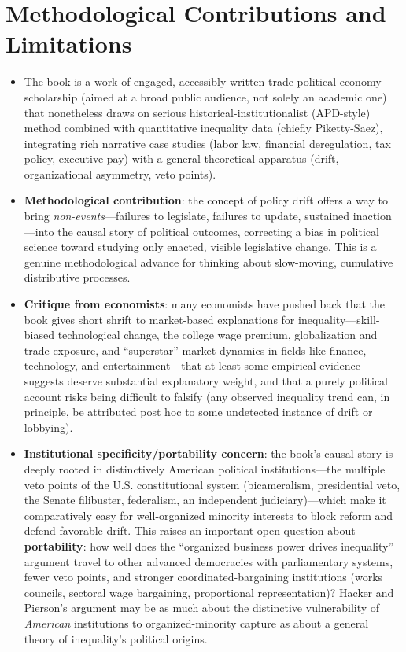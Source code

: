 \documentclass[12pt]{article}
\begin{document}
\section{Methodological Contributions and Limitations}

\begin{itemize}[leftmargin=*, itemsep=4pt]
    \item The book is a work of engaged, accessibly written trade political-economy scholarship (aimed at a broad public audience, not solely an academic one) that nonetheless draws on serious historical-institutionalist (APD-style) method combined with quantitative inequality data (chiefly Piketty-Saez), integrating rich narrative case studies (labor law, financial deregulation, tax policy, executive pay) with a general theoretical apparatus (drift, organizational asymmetry, veto points).
    \item \textbf{Methodological contribution}: the concept of policy drift offers a way to bring \emph{non-events}---failures to legislate, failures to update, sustained inaction---into the causal story of political outcomes, correcting a bias in political science toward studying only enacted, visible legislative change. This is a genuine methodological advance for thinking about slow-moving, cumulative distributive processes.
    \item \textbf{Critique from economists}: many economists have pushed back that the book gives short shrift to market-based explanations for inequality---skill-biased technological change, the college wage premium, globalization and trade exposure, and ``superstar'' market dynamics in fields like finance, technology, and entertainment---that at least some empirical evidence suggests deserve substantial explanatory weight, and that a purely political account risks being difficult to falsify (any observed inequality trend can, in principle, be attributed post hoc to some undetected instance of drift or lobbying).
    \item \textbf{Institutional specificity/portability concern}: the book's causal story is deeply rooted in distinctively American political institutions---the multiple veto points of the U.S. constitutional system (bicameralism, presidential veto, the Senate filibuster, federalism, an independent judiciary)---which make it comparatively easy for well-organized minority interests to block reform and defend favorable drift. This raises an important open question about \textbf{portability}: how well does the ``organized business power drives inequality'' argument travel to other advanced democracies with parliamentary systems, fewer veto points, and stronger coordinated-bargaining institutions (works councils, sectoral wage bargaining, proportional representation)? Hacker and Pierson's argument may be as much about the distinctive vulnerability of \emph{American} institutions to organized-minority capture as about a general theory of inequality's political origins.

\end{itemize}
\end{document}
